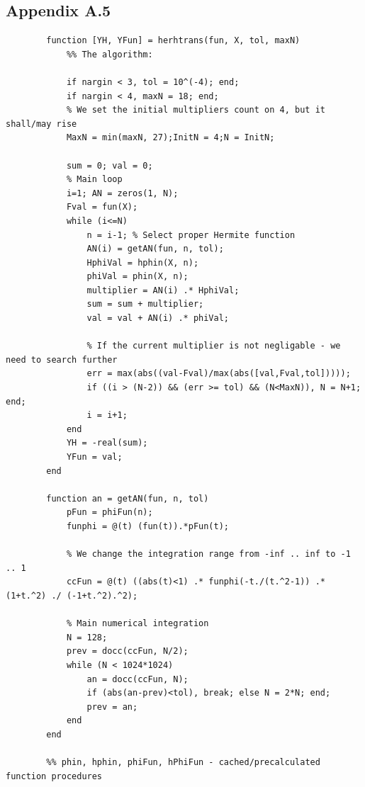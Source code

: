 \documentclass[12pt,twoside,a4paper]{article}
\numberwithin{equation}{subsection}
\numberwithin{figure}{subsection}
\begin{document}
\subsection*{Appendix A.5}
\begin{lstlisting}
		function [YH, YFun] = herhtrans(fun, X, tol, maxN)    
		    %% The algorithm:
		    
		    if nargin < 3, tol = 10^(-4); end;
		    if nargin < 4, maxN = 18; end;
		    % We set the initial multipliers count on 4, but it shall/may rise  
		    MaxN = min(maxN, 27);InitN = 4;N = InitN;
		    
		    sum = 0; val = 0;
		    % Main loop
		    i=1; AN = zeros(1, N);
		    Fval = fun(X);
		    while (i<=N)
		        n = i-1; % Select proper Hermite function
		        AN(i) = getAN(fun, n, tol);
		        HphiVal = hphin(X, n); 
		        phiVal = phin(X, n); 
		        multiplier = AN(i) .* HphiVal;
		        sum = sum + multiplier;
		        val = val + AN(i) .* phiVal;
		        
		        % If the current multiplier is not negligable - we need to search further
		        err = max(abs((val-Fval)/max(abs([val,Fval,tol]))));
		        if ((i > (N-2)) && (err >= tol) && (N<MaxN)), N = N+1; end; 
		        i = i+1;
		    end
		    YH = -real(sum);
		    YFun = val;
		end
		
		function an = getAN(fun, n, tol)
		    pFun = phiFun(n);
		    funphi = @(t) (fun(t)).*pFun(t);
		    
		    % We change the integration range from -inf .. inf to -1 .. 1
		    ccFun = @(t) ((abs(t)<1) .* funphi(-t./(t.^2-1)) .* (1+t.^2) ./ (-1+t.^2).^2);
		    
		    % Main numerical integration
		    N = 128; 
		    prev = docc(ccFun, N/2);
		    while (N < 1024*1024)
		        an = docc(ccFun, N);
		        if (abs(an-prev)<tol), break; else N = 2*N; end;
		        prev = an;
		    end
		end
		
		%% phin, hphin, phiFun, hPhiFun - cached/precalculated function procedures
\end{lstlisting}
\end{document}
